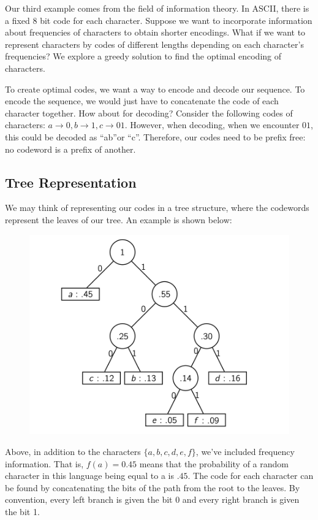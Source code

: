 \documentclass [12pt]{article}
\theoremstyle{definition}
\begin{document}
Our third example comes from the field of information theory. In ASCII, there is a fixed $8$
bit code for each character. Suppose we want to incorporate information about frequencies
of characters to obtain shorter encodings. What if we want to represent characters by codes
of different lengths depending on each character's frequencies? We explore a greedy solution
to find the optimal encoding of characters.

To create optimal codes, we want a way to encode and decode our sequence. To encode the
sequence, we would just have to concatenate the code of each character together. How about
for decoding? Consider the following codes of characters: $a \to 0, b \to 1, c \to 01$. However,
when decoding, when we encounter $01$, this could be decoded as ``ab''or ``c''. Therefore, our
codes need to be prefix free: no codeword is a prefix of another.


\subsection{Tree Representation}
We may think of representing our codes in a tree structure, where the codewords represent the leaves of our tree. An example is shown below:

\begin{figure}[h!]
\centering
\includegraphics{huffman_tree.png}
\end{figure}
 
Above, in addition to the characters $\{a, b, c, d, e, f \}$, we've included frequency information. That is, $f (a) = 0.45$ means that the probability of a random character in this language being equal to a is $.45$. The code for each character can be found by concatenating the bits of the path from the root to the leaves. By convention, every left branch is given the bit 0 and every right branch is given the bit 1.
\end{document}
